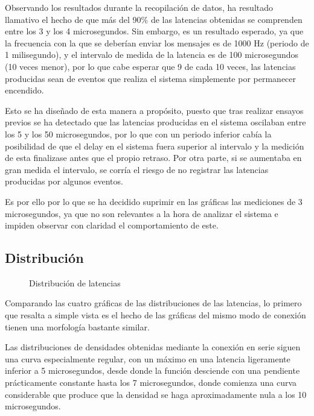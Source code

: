 \documentclass[a4paper,11pt,spanish]{sphinxmanual}
\let\sphinxpxdimen\pdfpxdimen\else\newdimen\sphinxpxdimen
\begin{document}
\sphinxAtStartPar
Observando los resultados durante la recopilación de datos, ha resultado llamativo el hecho de que más del
90\% de las latencias obtenidas se comprenden entre los 3 y los 4
microsegundos. Sin embargo, es un resultado esperado, ya que la frecuencia
con la que se deberían enviar los mensajes es de 1000 Hz (periodo de 1 milisegundo),
y el intervalo de medida de la latencia es de 100 microsegundos (10 veces menor),
por lo que cabe esperar que 9 de cada 10 veces, las latencias producidas sean
de eventos que realiza el sistema simplemente por permanecer encendido.

\sphinxAtStartPar
Esto se ha diseñado de esta manera a propósito, puesto que tras realizar
ensayos previos se ha detectado que las latencias producidas en el sistema oscilaban
entre los 5 y los 50 microsegundos, por lo que con un periodo inferior cabía
la posibilidad de que el delay en el sistema fuera superior al intervalo y la medición
de esta finalizase antes que el propio retraso. Por otra parte, si se aumentaba
en gran medida el intervalo, se corría el riesgo de no registrar las latencias
producidas por algunos eventos.

\sphinxAtStartPar
Es por ello por lo que se ha decidido suprimir en las gráficas las mediciones
de 3 microsegundos, ya que no son relevantes a la hora de analizar el sistema
e impiden observar con claridad el comportamiento de este.


\subsection{Distribución}
\label{\detokenize{resultados:distribucion}}
\begin{figure}[htbp]
\centering
\capstart

\noindent\sphinxincludegraphics[width=650\sphinxpxdimen]{{latency_dist}.png}
\caption{Distribución de latencias}\label{\detokenize{resultados:id2}}\end{figure}

\sphinxAtStartPar
Comparando las cuatro gráficas de las distribuciones de las latencias,
lo primero que resalta a simple vista es el hecho de las gráficas
del mismo modo de conexión tienen una morfología bastante similar.

\sphinxAtStartPar
Las distribuciones de densidades obtenidas mediante la conexión en
serie siguen una curva especialmente regular, con un máximo en una latencia
ligeramente inferior a 5 microsegundos, desde donde la función desciende con una pendiente
prácticamente constante hasta los 7 microsegundos, donde comienza una curva
considerable que produce que la densidad se haga aproximadamente nula a los
10 microsegundos.
\end{document}
